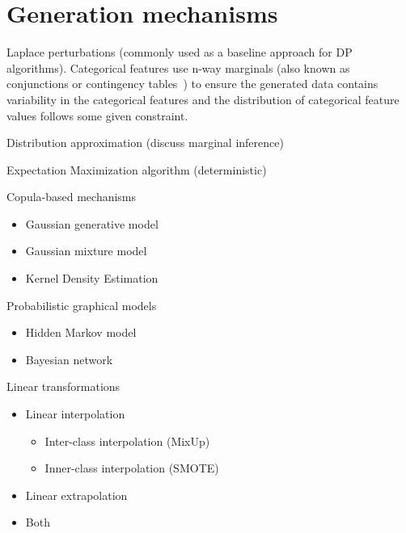 \documentclass[parskip=full]{scrartcl}
\begin{document}
% 
% 
% 
% 

\section{Generation mechanisms}

Laplace perturbations (commonly used as a baseline approach for DP
algorithms). Categorical features use n-way marginals (also known as
conjunctions or contingency tables~\cite{gaboardi2014dual}) to ensure the generated data contains
variability in the categorical features and the distribution of categorical
feature values follows some given constraint.

Distribution approximation (discuss marginal inference)

Expectation Maximization algorithm (deterministic)

Copula-based mechanisms
\begin{itemize}
    \item Gaussian generative model 
    \item Gaussian mixture model 
    \item Kernel Density Estimation
\end{itemize}

Probabilistic graphical models
\begin{itemize}
    \item Hidden Markov model
    \item Bayesian network
\end{itemize}


Linear transformations
\begin{itemize}
    \item Linear interpolation
        \begin{itemize}
            \item Inter-class interpolation (MixUp)
            \item Inner-class interpolation (SMOTE)
        \end{itemize}
    \item Linear extrapolation
    \item Both
\end{itemize}
\end{document}
